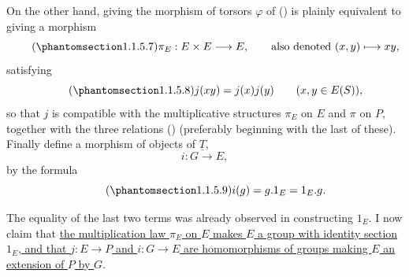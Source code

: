 On the other hand, giving the morphism of torsors $\varphi$ of
() is plainly equivalent to giving a morphism
\begin{equation}\tag{\SGARefTarget{sga7.sga7i.evii.n1-1-5-7}{1.1.5.7}}
 \pi_E:E\times E\longrightarrow E,
 \qquad\text{also denoted }(x,y)\longmapsto xy,
\end{equation}
satisfying
\begin{equation}\tag{\SGARefTarget{sga7.sga7i.evii.n1-1-5-8}{1.1.5.8}}
 j(xy)=j(x)j(y)\qquad(x,y\in E(S)),
\end{equation}
so that $j$ is compatible with the multiplicative structures $\pi_E$
on $E$ and $\pi$ on $P$, together with the three relations ()
(preferably beginning with the last of these). Finally define a morphism
of objects of $\underline T$,
\[
 i:G\longrightarrow E,
\]
by the formula
\begin{equation}\tag{\SGARefTarget{sga7.sga7i.evii.n1-1-5-9}{1.1.5.9}}
 i(g)=g.1_E=1_E.g.
\end{equation}


The equality of the last two terms was already observed in constructing
$1_E$. I now claim that \underline{the multiplication law $\pi_E$ on
$E$ makes $E$ a group with identity section $1_E$, and that
$j:E\longrightarrow P$ and $i:G\longrightarrow E$ are homomorphisms of
groups making $E$ an extension of $P$ by $G$}.


